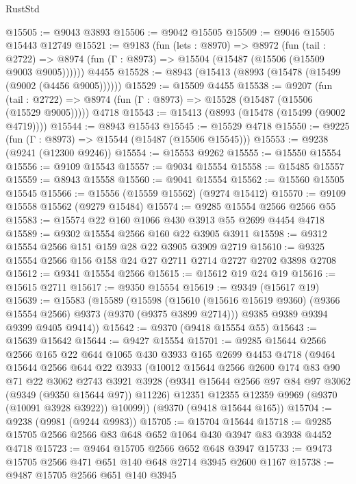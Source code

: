 \begin{lexlean}{RustStd}
\begin{coremodule}
{\begin{coremodule}
{{{{{{{{{{{{{{{{{{{{{{{{{{{{{{{{{{{{{{{@15505 := @9043 @3893
@15506 := @9042 @15505
@15509 := @9046 @15505 @15443 @12749
@15521 := @9183
    (fun (lets : @8970) =>
    @8972
      (fun (tail : @2722) =>
      @8974 (fun (Γ : @8973) => @15504 (@15487 (@15506 (@15509 @9003 @9005))))))
    @4455
@15528 := @8943 (@15413 (@8993 (@15478 (@15499 (@9002 (@4456 @9005))))))
@15529 := @15509 @4455
@15538 := @9207
    (fun (tail : @2722) => @8974 (fun (Γ : @8973) => @15528 (@15487 (@15506 (@15529 @9005)))))
    @4718
@15543 := @15413 (@8993 (@15478 (@15499 (@9002 @4719))))
@15544 := @8943 @15543
@15545 := @15529 @4718
@15550 := @9225 (fun (Γ : @8973) => @15544 (@15487 (@15506 @15545)))
@15553 := @9238 (@9241 (@12300 @9246))
@15554 := @15553 @9262
@15555 := @15550 @15554
@15556 := @9109 @15543
@15557 := @9034 @15554
@15558 := @15485 @15557
@15559 := @8943 @15558
@15560 := @9041 @15554
@15562 := @15560 @15505 @15545
@15566 := @15556 (@15559 @15562) (@9274 @15412)
@15570 := @9109 @15558 @15562 (@9279 @15484)
@15574 := @9285 @15554 @2566 @2566 @55
@15583 := @15574 @22 @160 @1066 @430 @3913 @55 @2699 @4454 @4718
@15589 := @9302 @15554 @2566 @160 @22 @3905 @3911
@15598 := @9312 @15554 @2566 @151 @159 @28 @22 @3905 @3909 @2719
@15610 := @9325 @15554 @2566 @156 @158 @24 @27 @2711 @2714 @2727 @2702 @3898 @2708
@15612 := @9341 @15554 @2566
@15615 := @15612 @19 @24 @19
@15616 := @15615 @2711
@15617 := @9350 @15554
@15619 := @9349 (@15617 @19)
@15639 := @15583
    (@15589
      (@15598
        (@15610 (@15616 @15619 @9360) (@9366 @15554 @2566) @9373 (@9370 (@9375 @3899 @2714)))
        @9385
        @9389
        @9394
        @9399
        @9405
        @9414))
@15642 := @9370 (@9418 @15554 @55)
@15643 := @15639 @15642
@15644 := @9427 @15554
@15701 := @9285
    @15644
    @2566
    @2566
    @165
    @22
    @644
    @1065
    @430
    @3933
    @165
    @2699
    @4453
    @4718
    (@9464
      @15644
      @2566
      @644
      @22
      @3933
      (@10012
        @15644
        @2566
        @2600
        @174
        @83
        @90
        @71
        @22
        @3062
        @2743
        @3921
        @3928
        (@9341 @15644 @2566 @97 @84 @97 @3062 (@9349 (@9350 @15644 @97)) @11226)
        @12351
        @12355
        @12359
        @9969
        (@9370 (@10091 @3928 @3922))
        @10099))
    (@9370 (@9418 @15644 @165))
@15704 := @9238 (@9981 (@9244 @9983))
@15705 := @15704 @15644
@15718 := @9285 @15705 @2566 @2566 @83 @648 @652 @1064 @430 @3947 @83 @3938 @4452 @4718
@15723 := @9464 @15705 @2566 @652 @648 @3947
@15733 := @9473 @15705 @2566 @471 @651 @140 @648 @2714 @3945 @2600 @1167
@15738 := @9487 @15705 @2566 @651 @140 @3945
}}}}}}}}}}}}}}}}}}}}}}}}}}}}}}}}}}}}}}}
\end{coremodule}}
\end{coremodule}
\end{lexlean}
